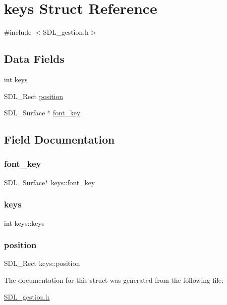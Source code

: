 \hypertarget{structkeys}{}\section{keys Struct Reference}
\label{structkeys}


{\ttfamily \#include $<$S\+D\+L\+\_\+gestion.\+h$>$}

\subsection*{Data Fields}
\begin{DoxyCompactItemize}
\item 
int \mbox{\hyperlink{structkeys_a7559bc5bb2d0727a0be1ce90578d1052}{keys}}
\item 
S\+D\+L\+\_\+\+Rect \mbox{\hyperlink{structkeys_ae4cc6eb9699ee2a27c6cb5aac95db788}{position}}
\item 
S\+D\+L\+\_\+\+Surface $\ast$ \mbox{\hyperlink{structkeys_a79d35a45748c103bf3158388c7c433f7}{font\+\_\+key}}
\end{DoxyCompactItemize}


\subsection{Field Documentation}
\mbox{\label{structkeys_a79d35a45748c103bf3158388c7c433f7}} 
\subsubsection{\texorpdfstring{font\_key}{font\_key}}
{\footnotesize\ttfamily S\+D\+L\+\_\+\+Surface$\ast$ keys\+::font\+\_\+key}

\mbox{\label{structkeys_a7559bc5bb2d0727a0be1ce90578d1052}} 
\subsubsection{\texorpdfstring{keys}{keys}}
{\footnotesize\ttfamily int keys\+::keys}

\mbox{\label{structkeys_ae4cc6eb9699ee2a27c6cb5aac95db788}} 
\subsubsection{\texorpdfstring{position}{position}}
{\footnotesize\ttfamily S\+D\+L\+\_\+\+Rect keys\+::position}



The documentation for this struct was generated from the following file\+:\begin{DoxyCompactItemize}
\item 
\mbox{\hyperlink{SDL__gestion_8h}{S\+D\+L\+\_\+gestion.\+h}}\end{DoxyCompactItemize}
